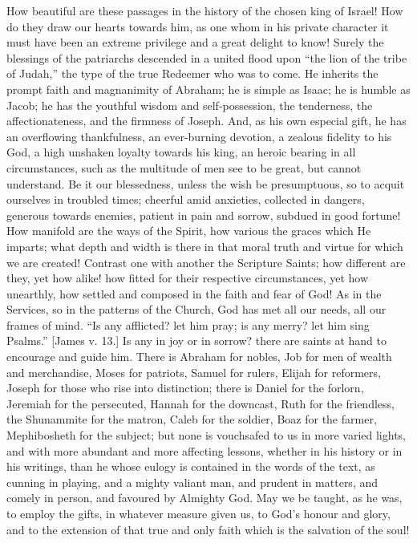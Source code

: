 How beautiful are these passages in the history of the chosen king
of Israel! How do they draw our hearts towards him, as one whom in his
private character it must have been an extreme privilege and a great
delight to know! Surely the blessings of the patriarchs descended in a
united flood upon ``the lion of the tribe of Judah,'' the type
of the true Redeemer who was to come. He inherits the prompt faith and
magnanimity of Abraham; he is simple as Isaac; he is humble as Jacob;
he has the youthful wisdom and self-possession, the tenderness, the
affectionateness, and the firmness of Joseph. And, as his own especial
gift, he has an overflowing thankfulness, an ever-burning devotion, a
zealous fidelity to his God, a high unshaken loyalty towards his king,
an heroic bearing in all circumstances, such as the multitude of men
see to be great, but cannot understand. Be it our blessedness, unless
the wish be presumptuous, so to acquit ourselves in troubled times;
cheerful amid anxieties, collected in dangers, generous towards
enemies, patient in pain and sorrow, subdued in good fortune! How
manifold are the ways of the Spirit, how various the graces which He
imparts; what depth and width is there in that moral truth and virtue
for which we are created! Contrast one with another the Scripture
Saints; how different are they, yet how alike! how fitted for their
respective circumstances, yet how unearthly, how settled and composed
in the faith and fear of God! As in the Services, so in the patterns
of the Church, God has met all our needs, all our frames of mind.
``Is any afflicted? let him pray; is any merry? let him sing
Psalms.'' [James v. 13.] Is any in joy or in sorrow? there are
saints at hand to encourage and guide him. There is Abraham for
nobles, Job for men of wealth and merchandise, Moses for patriots,
Samuel for rulers, Elijah for reformers, Joseph for those who rise
into distinction; there is Daniel for the forlorn, Jeremiah for the
persecuted, Hannah for the downcast, Ruth for the friendless, the
Shunammite for the matron, Caleb for the soldier, Boaz for the farmer,
Mephibosheth for the subject; but none is vouchsafed to us in more
varied lights, and with more abundant and more affecting lessons,
whether in his history or in his writings, than he whose eulogy is
contained in the words of the text, as cunning in playing, and a mighty
valiant man, and prudent in matters, and comely in person, and
favoured by Almighty God. May we be taught, as he was, to employ the
gifts, in whatever measure given us, to God's honour and glory, and to
the extension of that true and only faith which is the salvation of
the soul!

